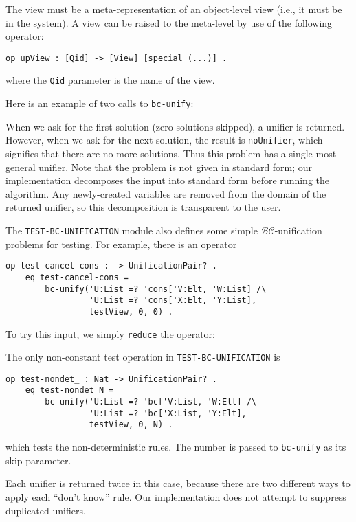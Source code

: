 \documentclass[11pt,twoside,titlepage]{article}
\newcommand{\BC}{\mathcal{BC}}
\begin{document}
The view must be a meta-representation of an object-level view (i.e., it must
be in the system). A view can be raised to the meta-level by use of the
following operator:
\begin{lstlisting}[language=Maude, style=smalllisting]
    op upView : [Qid] -> [View] [special (...)] .
\end{lstlisting}
where the \lstinline|Qid| parameter is the name of the view.

Here is an example of two calls to \lstinline|bc-unify|:
\vspace{1ex}

When we ask for the first solution (zero solutions skipped), a unifier is
returned. However, when we ask for the next solution, the result is
\lstinline|noUnifier|, which signifies that there are no more solutions.  Thus
this problem has a single most-general unifier.  Note that the problem is not
given in standard form; our implementation decomposes the input into standard
form before running the algorithm. Any newly-created variables are removed from
the domain of the returned unifier, so this decomposition is transparent to the
user.

The \lstinline|TEST-BC-UNIFICATION| module also defines some simple
$\BC$-unification problems for testing. For example, there is an operator
\begin{lstlisting}[language=Maude, style=smalllisting]
    op test-cancel-cons : -> UnificationPair? .
    eq test-cancel-cons =
        bc-unify('U:List =? 'cons['V:Elt, 'W:List] /\
                 'U:List =? 'cons['X:Elt, 'Y:List],
                 testView, 0, 0) .
\end{lstlisting}
To try this input, we simply \lstinline|reduce| the operator:
\vspace{1ex}


\vspace{1ex}

The only non-constant test operation in \lstinline|TEST-BC-UNIFICATION| is
\begin{lstlisting}[language=Maude, style=smalllisting]
    op test-nondet_ : Nat -> UnificationPair? .
    eq test-nondet N =
        bc-unify('U:List =? 'bc['V:List, 'W:Elt] /\
                 'U:List =? 'bc['X:List, 'Y:Elt],
                 testView, 0, N) .
\end{lstlisting}
which tests the non-deterministic rules. The number is passed to
\lstinline|bc-unify| as its skip parameter.
\vspace{1ex}

Each unifier is returned twice in this case, because there are two different
ways to apply each ``don't know'' rule. Our implementation does not attempt to
suppress duplicated unifiers.
\end{document}
